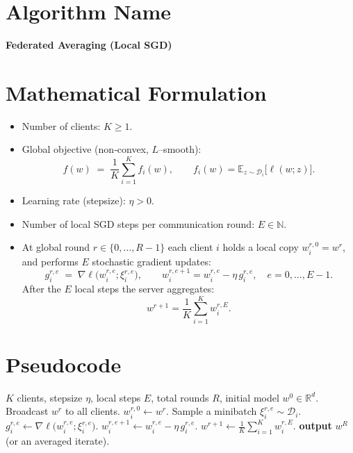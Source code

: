 \documentclass{article}
\newcommand{\EE}{\mathbb{E}}
\newcommand{\RR}{\mathbb{R}}
\begin{document}
\section*{Algorithm Name}
\textbf{Federated Averaging (Local SGD)}  

\section*{Mathematical Formulation}
\begin{itemize}
    \item Number of clients: $K\ge 1$.
    \item Global objective (non‑convex, $L$–smooth):
    \[
        f(w)\;=\;\frac1K\sum_{i=1}^{K} f_i(w),\qquad 
        f_i(w)=\EE_{z\sim\mathcal D_i}\big[\ell(w;z)\big].
    \]
    \item Learning rate (stepsize): $\eta>0$.
    \item Number of local SGD steps per communication round: $E\in\mathbb N$.
    \item At global round $r\in\{0,\dots,R-1\}$ each client $i$ holds a local copy
    $w_{i}^{r,0}=w^{r}$, and performs $E$ stochastic gradient updates:
    \[
        g_{i}^{r,e}\;=\;\nabla\ell\big(w_{i}^{r,e};\xi_{i}^{r,e}\big),\qquad 
        w_{i}^{r,e+1}=w_{i}^{r,e}-\eta\, g_{i}^{r,e},
        \quad e=0,\dots,E-1 .
    \]
    After the $E$ local steps the server aggregates:
    \[
        w^{r+1}= \frac1K\sum_{i=1}^{K} w_{i}^{r,E}.
    \]
\end{itemize}

\section*{Pseudocode}
\begin{algorithm}[H]
\caption{Federated Averaging (Local SGD)}\label{alg:fedavg}
\begin{algorithmic}[1]
\Require $K$ clients, stepsize $\eta$, local steps $E$, total rounds $R$, initial model $w^{0}\in\RR^{d}$.
    \State Broadcast $w^{r}$ to all clients.
        \State $w_{i}^{r,0}\gets w^{r}$.
            \State Sample a minibatch $\xi_{i}^{r,e}\sim\mathcal D_i$.
            \State $g_{i}^{r,e}\gets \nabla\ell\big(w_{i}^{r,e};\xi_{i}^{r,e}\big)$.
            \State $w_{i}^{r,e+1}\gets w_{i}^{r,e}-\eta\, g_{i}^{r,e}$.
        \EndFor
    \EndFor
    \State $w^{r+1}\gets \frac1K\sum_{i=1}^{K} w_{i}^{r,E}$.
\EndFor
\State \textbf{output} $w^{R}$ (or an averaged iterate).
\end{algorithmic}
\end{algorithm}
\end{document}

